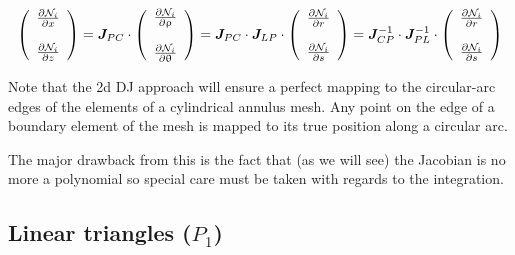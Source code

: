 \begin{equation}
\left(
\begin{array}{c}
\frac{\partial {\mathcal{N}}_i}{\partial x} \\ \\
\frac{\partial {\mathcal{N}}_i}{\partial z} 
\end{array}
\right)
= 
{\bm J}_{PC} \cdot 
\left(
\begin{array}{c}
\frac{\partial {\mathcal{N}}_i}{\partial \uprho}  \\ \\
\frac{\partial {\mathcal{N}}_i}{\partial \uptheta}
\end{array}
\right)
=
{\bm J}_{PC} \cdot 
{\bm J}_{LP} \cdot 
\left(
\begin{array}{c}
\frac{\partial {\mathcal{N}}_i}{\partial r} \\ \\
\frac{\partial {\mathcal{N}}_i}{\partial s} 
\end{array}
\right)
=
{\bm J}_{CP}^{-1} \cdot 
{\bm J}_{PL}^{-1} \cdot 
\left(
\begin{array}{c}
\frac{\partial {\mathcal{N}}_i}{\partial r} \\ \\
\frac{\partial {\mathcal{N}}_i}{\partial s} 
\end{array}
\right)
\label{eq:DJ123}
\end{equation}

Note that the 2d DJ approach will ensure a perfect mapping to the circular-arc edges of the 
elements of a cylindrical annulus mesh.
Any point on the edge of a boundary element of the mesh is mapped to its true position along 
a circular arc.

The major drawback from this is the fact that (as we will see) the Jacobian is no more a polynomial
so special care must be taken with regards to the integration.

\subsection{Linear triangles ($P_1$)}

